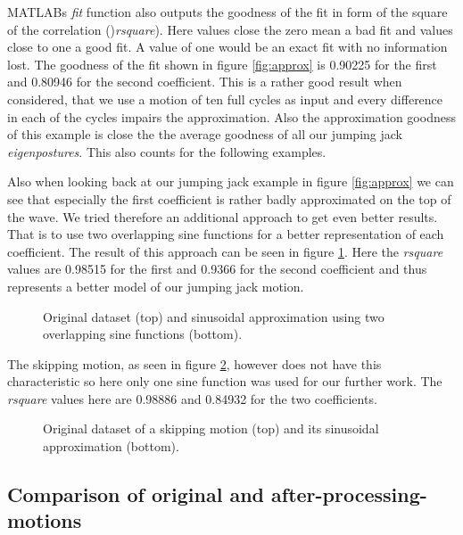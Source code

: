 \documentclass[a4paper]{article}
\begin{document}
MATLABs \emph{fit} function also outputs the goodness of the fit in form of the square of the correlation ()\emph{rsquare}).
Here values close the zero mean a bad fit and values close to one a good fit.
A value of one would be an exact fit with no information lost.
The goodness of the fit shown in figure \ref{fig:approx} is 0.90225 for the first and 0.80946 for the second coefficient.
This is a rather good result when considered, that we use a motion of ten full cycles as input and every difference in each of the cycles impairs the approximation. 
Also the approximation goodness of this example is close the the average goodness of all our jumping jack \emph{eigenpostures}.
This also counts for the following examples.

Also when looking back at our jumping jack example in figure \ref{fig:approx} we can see that especially the first coefficient is rather badly approximated on the top of the wave.
We tried therefore an additional approach to get even better results. That is to use two overlapping sine functions for a better representation of each coefficient.
The result of this approach can be seen in figure \ref{fig:approx2}.
Here the \emph{rsquare} values are 0.98515 for the first and 0.9366 for the second coefficient and thus represents a better model of our jumping jack motion.

\begin{figure}[htb]
		\centering
		\caption{Original dataset (top) and sinusoidal approximation using two overlapping sine functions (bottom).}
		\label{fig:approx2}
\end{figure}

The skipping motion, as seen in figure \ref{fig:approx3}, however does not have this characteristic so here only one sine function was used for our further work.
The \emph{rsquare} values here are 0.98886 and 0.84932 for the two coefficients.

\begin{figure}[htb]
		\centering
		\caption{Original dataset of a skipping motion (top) and its sinusoidal approximation (bottom).}
		\label{fig:approx3}
\end{figure}


\subsection{Comparison of original and after-processing-motions}

\end{document}

